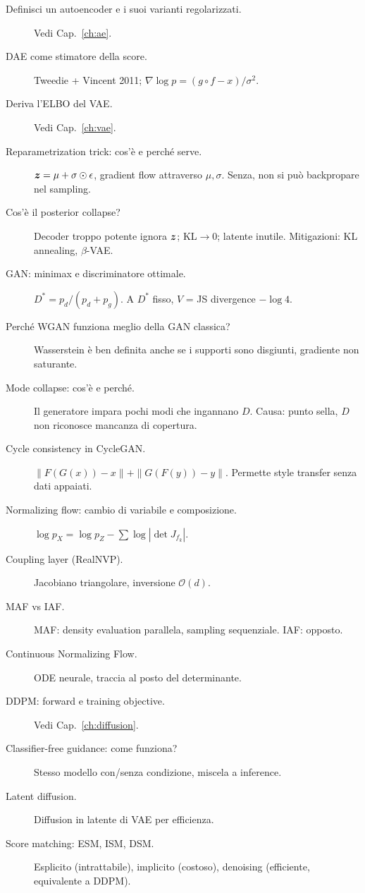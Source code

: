 \begin{description}
  \item[Definisci un autoencoder e i suoi varianti regolarizzati.] Vedi Cap.~\ref{ch:ae}.
  \item[DAE come stimatore della score.] Tweedie + Vincent 2011; $\nabla\log p = (g\circ f - x)/\sigma^2$.
  \item[Deriva l'ELBO del VAE.] Vedi Cap.~\ref{ch:vae}.
  \item[Reparametrization trick: cos'è e perché serve.] $\bm{z} = \mu + \sigma\odot\epsilon$, gradient flow attraverso $\mu,\sigma$. Senza, non si può backpropare nel sampling.
  \item[Cos'è il posterior collapse?] Decoder troppo potente ignora $\bm{z}$; KL$\to 0$; latente inutile. Mitigazioni: KL annealing, $\beta$-VAE.
  \item[GAN: minimax e discriminatore ottimale.] $D^* = p_d/(p_d+p_g)$. A $D^*$ fisso, $V$ = JS divergence $-\log 4$.
  \item[Perché WGAN funziona meglio della GAN classica?] Wasserstein è ben definita anche se i supporti sono disgiunti, gradiente non saturante.
  \item[Mode collapse: cos'è e perché.] Il generatore impara pochi modi che ingannano $D$. Causa: punto sella, $D$ non riconosce mancanza di copertura.
  \item[Cycle consistency in CycleGAN.] $\|F(G(x))-x\| + \|G(F(y))-y\|$. Permette style transfer senza dati appaiati.
  \item[Normalizing flow: cambio di variabile e composizione.] $\log p_X = \log p_Z - \sum \log|\det J_{f_k}|$.
  \item[Coupling layer (RealNVP).] Jacobiano triangolare, inversione $\mathcal{O}(d)$.
  \item[MAF vs IAF.] MAF: density evaluation parallela, sampling sequenziale. IAF: opposto.
  \item[Continuous Normalizing Flow.] ODE neurale, traccia al posto del determinante.
  \item[DDPM: forward e training objective.] Vedi Cap.~\ref{ch:diffusion}.
  \item[Classifier-free guidance: come funziona?] Stesso modello con/senza condizione, miscela a inference.
  \item[Latent diffusion.] Diffusion in latente di VAE per efficienza.
  \item[Score matching: ESM, ISM, DSM.] Esplicito (intrattabile), implicito (costoso), denoising (efficiente, equivalente a DDPM).

\end{description}
